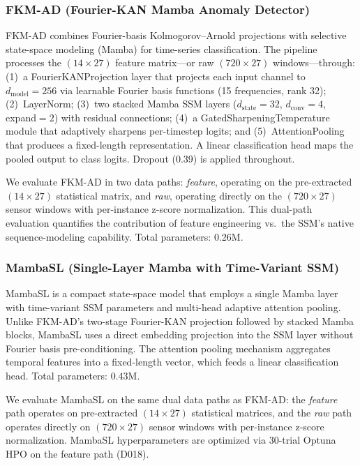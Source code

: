 \documentclass[conference]{IEEEtran}
\begin{document}
\subsubsection{FKM-AD (Fourier-KAN Mamba Anomaly Detector)}

FKM-AD \cite{fkmad} combines Fourier-basis Kolmogorov--Arnold projections with selective state-space modeling (Mamba) for time-series classification. The pipeline processes the $(14 \times 27)$ feature matrix---or raw $(720 \times 27)$ windows---through: (1)~a FourierKANProjection layer that projects each input channel to $d_\text{model}{=}256$ via learnable Fourier basis functions (15 frequencies, rank 32); (2)~LayerNorm; (3)~two stacked Mamba SSM layers ($d_\text{state}{=}32$, $d_\text{conv}{=}4$, expand$=2$) with residual connections; (4)~a GatedSharpeningTemperature module that adaptively sharpens per-timestep logits; and (5)~AttentionPooling that produces a fixed-length representation. A linear classification head maps the pooled output to class logits. Dropout (0.39) is applied throughout.

We evaluate FKM-AD in two data paths: \textit{feature}, operating on the pre-extracted $(14 \times 27)$ statistical matrix, and \textit{raw}, operating directly on the $(720 \times 27)$ sensor windows with per-instance z-score normalization. This dual-path evaluation quantifies the contribution of feature engineering vs.\ the SSM's native sequence-modeling capability. Total parameters: 0.26M.

\subsubsection{MambaSL (Single-Layer Mamba with Time-Variant SSM)}

MambaSL \cite{mambasl} is a compact state-space model that employs a single Mamba layer with time-variant SSM parameters and multi-head adaptive attention pooling. Unlike FKM-AD's two-stage Fourier-KAN projection followed by stacked Mamba blocks, MambaSL uses a direct embedding projection into the SSM layer without Fourier basis pre-conditioning. The attention pooling mechanism aggregates temporal features into a fixed-length vector, which feeds a linear classification head. Total parameters: 0.43M.

We evaluate MambaSL on the same dual data paths as FKM-AD: the \textit{feature} path operates on pre-extracted $(14 \times 27)$ statistical matrices, and the \textit{raw} path operates directly on $(720 \times 27)$ sensor windows with per-instance z-score normalization. MambaSL hyperparameters are optimized via 30-trial Optuna HPO on the feature path (D018).
\end{document}

